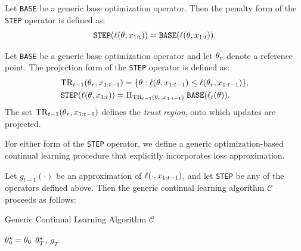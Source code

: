 \documentclass[10pt]{article} %
\begin{document}
\begin{defn}
\label{def:step-penalty-form}
Let \texttt{BASE} be a generic base optimization operator.  
Then the penalty form of the \texttt{STEP} operator is defined as:
\begin{align}
    \texttt{STEP}(\ell(\theta, x_{1:t})) = \texttt{BASE}(\ell(\theta, x_{1:t})).
\end{align}
\end{defn}

\begin{defn}
\label{def:step-projection-form}
Let \texttt{BASE} be a generic base optimization operator and let $\theta_r$ denote a reference point.  
The projection form of the \texttt{STEP} operator is defined as:
\begin{align}
    & \mathrm{TR}_{t-1}(\theta_r, x_{1:t-1}) = 
        \{ \theta : \ell(\theta, x_{1:t-1}) \leq \ell(\theta_r, x_{1:t-1}) \}, \\
    & \texttt{STEP}(\ell(\theta, x_{1:t})) 
        = \Pi_{\mathrm{TR}_{t-1}(\theta_r, x_{1:t-1})}
        \; \texttt{BASE}(\ell_t(\theta)).
\end{align}
The set $\mathrm{TR}_{t-1}(\theta_r, x_{1:t-1})$ defines the \emph{trust region}, onto which updates are projected.
\end{defn}

\vspace{0.5em}
For either form of the \texttt{STEP} operator, we define a generic optimization-based continual learning procedure that explicitly incorporates loss approximation.

\begin{defn}
\label{def:cl-loss-approx}
Let $g_{t-1}(\cdot)$ be an approximation of $\ell(\cdot, x_{1:t-1})$, and let \texttt{STEP} be any of the operators defined above.  
Then the generic continual learning algorithm $\mathcal{C}$ proceeds as follows:
\begin{center}
\begin{minipage}{0.65\textwidth}
\begin{algorithm}[H]
\caption{Generic Continual Learning Algorithm $\mathcal{C}$}
\label{alg:cl-loss-approx}
$\theta_0^\star = \theta_0$ 
\Return $\theta_T^\star$, $g_T$
\end{algorithm}
\end{minipage}
\end{center}
\end{defn}
\end{document}
